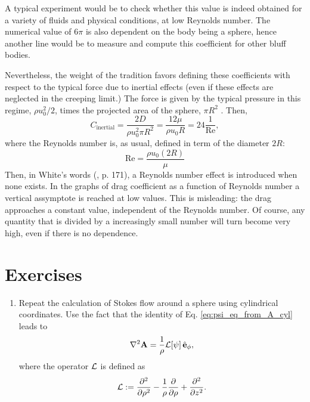 A typical experiment would be to check whether this value is indeed
obtained for a variety of fluids and physical conditions, at low
Reynolds number. The numerical value of $6\pi$ is also dependent
on the body being a sphere, hence another line would be to measure
and compute this coefficient for other bluff bodies.

Nevertheless, the weight of the tradition favors defining these
coefficients with respect to the typical force due to inertial effects
(even if these effects are neglected in the creeping limit.) The force
is given by the typical pressure in this regime, $\rho u_0^2 / 2 $,
times the projected area of the sphere, $\pi R^2$ . Then,
\[
  C_\mathrm{inertial} = \frac{  2 D }{ \rho u_0^2 \pi R^2 } =
  \frac{  12 \mu  }{ \rho u_0 R }   =
  24 \frac{1}{\mathrm{Re}} ,
\]
where the Reynolds number is, as usual, defined in term of the
diameter $2R$:
\[
  \mathrm{Re} = \frac{ \rho u_0 ( 2 R ) }{ \mu } 
\]
Then, in White's words (\cite{white1991viscous}, p. 171), a Reynolds
number effect is introduced when none exists. In the graphs of drag
coefficient as a function of Reynolds number a vertical assymptote is
reached at low values. This is misleading: the drag approaches a
constant value, independent of the Reynolds number. Of course, any
quantity that is divided by a increasingly small number will turn
become very high, even if there is no dependence.


\section{Exercises}


\begin{enumerate}

\item Repeat the calculation of Stokes flow around a sphere using
  cylindrical coordinates. Use the fact that the identity of
  Eq. \ref{eq:psi_eq_from_A_cyl} leads to
  \begin{equation*}
    \nabla^2 \mathbf{A} = \frac{1}{\rho } {\cal L} [\psi] \, \hat{\mathbf{e}}_\phi ,
  \end{equation*}
  where the operator $\cal L$ is defined as
  \[
    {\cal L} :=
    \frac{\partial^2  }{\partial \rho^2} -
    \frac{1}{ \rho } 
    \frac{\partial  }{\partial \rho} +
    \frac{\partial^2  }{\partial z^2}.
  \]
\end{enumerate}